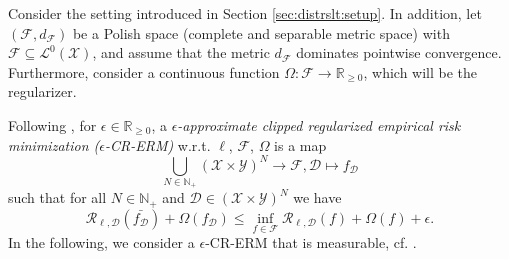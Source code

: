 \documentclass[letterpaper]{article} %
\newcommand{\R}{\mathbb{R}}
\newcommand{\Rnn}{\R_{\geq 0}}
\newcommand{\Np}{\mathbb{N}_+}
\newcommand{\MeasurableFunctions}{{\mathcal{L}^0}}
\newcommand{\inputSet}{\mathcal{X}} %
\newcommand{\outputSet}{\mathcal{Y}} %
\newcommand{\dataSet}{\mathcal{D}}
\newcommand{\risk}{\mathcal{R}} %
\newcommand{\Risk}[2]{\risk_{{#1},{#2}}} %
\newcommand{\regularizer}{\Omega}
\newcommand{\clipped}[1]{\bar{#1}}
\newcommand{\defm}[1]{\emph{#1}}
\begin{document}
Consider the setting introduced in Section \ref{sec:distrslt:setup}.
In addition, let $(\mathcal{F},d_\mathcal{F})$ be a Polish space (complete and separable metric space) with $\mathcal{F}\subseteq\MeasurableFunctions(\inputSet)$, and assume that the metric $d_\mathcal{F}$ dominates pointwise convergence.
Furthermore, consider a continuous function $\regularizer: \mathcal{F}\rightarrow\Rnn$, which will be the regularizer.

Following \cite[Definition~7.18]{SC08}, for $\epsilon\in\Rnn$, a \defm{$\epsilon$-approximate clipped regularized empirical risk minimization ($\epsilon$-CR-ERM)} w.r.t. $\ell$, $\mathcal{F}$, $\regularizer$ is a map
\begin{equation*}
    \bigcup_{N\in\Np} (\inputSet\times\outputSet)^N \rightarrow \mathcal{F},
    \dataSet \mapsto f_\dataSet
\end{equation*}
such that for all $N\in\Np$ and $\dataSet \in (\inputSet\times\outputSet)^N$ we have
\begin{equation}
    \Risk{\ell}{\dataSet}(\clipped{f_\dataSet}) + \regularizer(f_{\dataSet}) 
    \leq
    \inf_{f \in \mathcal{F}} \Risk{\ell}{\dataSet}(f) + \regularizer(f) + \epsilon.
\end{equation}
In the following, we consider a $\epsilon$-CR-ERM that is measurable, cf. \cite[Lemma~7.19]{SC08}.
\end{document}
